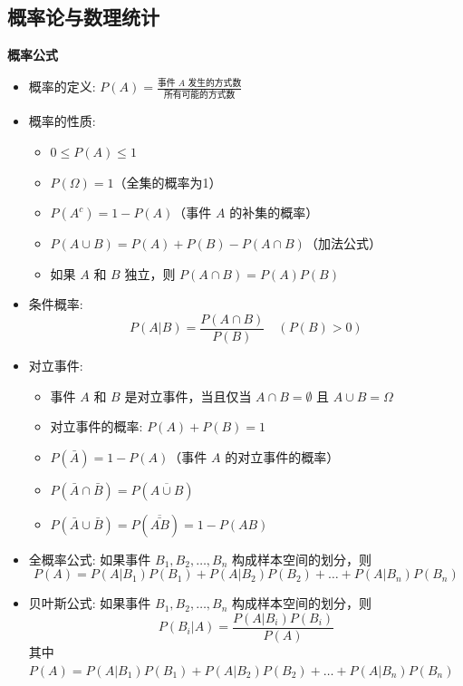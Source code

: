 \documentclass[10pt]{article}
\begin{document}
\newpage
\begin{multicols}{2}
\raggedcolumns




\section*{概率论与数理统计}

\textbf{概率公式}

\begin{itemize}
  \item 概率的定义: \(P(A) = \frac{\text{事件 } A \text{ 发生的方式数}}{\text{所有可能的方式数}}\)
  \item 概率的性质:
    \begin{itemize}
      \item \(0 \leq P(A) \leq 1\)
      \item \(P(\Omega) = 1\)（全集的概率为1）
      \item \(P(A^c) = 1 - P(A)\)（事件 \(A\) 的补集的概率）
      \item \(P(A \cup B) = P(A) + P(B) - P(A \cap B)\)（加法公式）
      \item 如果 \(A\) 和 \(B\) 独立，则 \(P(A \cap B) = P(A) P(B)\)
    \end{itemize}
  \item 条件概率: 
    \[
    P(A|B) = \frac{P(A \cap B)}{P(B)}\quad (P(B) > 0)
    \]
  \item 对立事件:
    \begin{itemize}
      \item 事件 \(A\) 和 \(B\) 是对立事件，当且仅当 \(A \cap B = \emptyset\) 且 \(A \cup B = \Omega\)
      \item 对立事件的概率: \(P(A) + P(B) = 1\)
      \item \(P(\bar{A}) = 1 - P(A)\)（事件 \(A\) 的对立事件的概率）
      \item \(P(\bar{A} \cap \bar{B}) = P(\overline{A \cup B})\)
      \item \(P(\bar{A} \cup \bar{B}) = P(\overline{\bar{AB}})=1-P(AB)\)
    \end{itemize}
  \item 全概率公式:
    如果事件 \(B_1, B_2, \ldots, B_n\) 构成样本空间的划分，则
    \[
    P(A) = P(A|B_1)P(B_1) + P(A|B_2)P(B_2) + \ldots + P(A|B_n)P(B_n)
    \]
  \item 贝叶斯公式:
    如果事件 \(B_1, B_2, \ldots, B_n\) 构成样本空间的划分，则
    \[
    P(B_i|A) = \frac{P(A|B_i)P(B_i)}{P(A)}
    \]
    其中 \(P(A) = P(A|B_1)P(B_1) + P(A|B_2)P(B_2) + \ldots + P(A|B_n)P(B_n)\)


\end{itemize}
\end{multicols}
\end{document}
